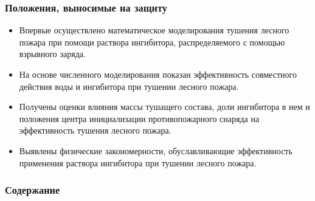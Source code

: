 \begin{frame}
    \setcounter{framenumber}{1}
    \maketitle
\end{frame}

\begin{frame}
    \frametitle{Положения, выносимые на защиту}
    \begin{itemize}
        \item Впервые осуществлено математическое моделирования тушения лесного пожара при помощи раствора ингибитора,
              распределяемого с помощью взрывного заряда.
        \item На основе численного моделирования показан эффективность совместного действия воды и ингибитора при
              тушении лесного пожара.
        \item Получены оценки влияния массы тушащего состава, доли ингибитора в нем и положения центра инициализации
              противопожарного снаряда на эффективность тушения лесного пожара.
        \item Выявлены физические закономерности, обуславливающие эффективность применения раствора ингибитора при
              тушении лесного пожара.
    \end{itemize}
\end{frame}

\begin{frame}
    \frametitle{Содержание}
    \tableofcontents
\end{frame}
